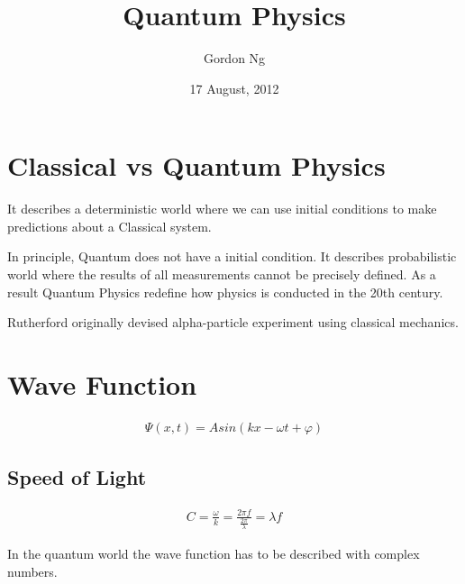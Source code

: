 \documentclass[12pt]{article}
\numberwithin{equation}{section}
\begin{document}
\title{Quantum Physics}
\date{17 August, 2012}
\author{Gordon Ng}
\maketitle
\pagebreak
\tableofcontents
\pagebreak
\section{Classical vs Quantum Physics}
It describes a deterministic world where we can use initial conditions to make predictions about a Classical system.

In principle, Quantum does not have a initial condition. It describes probabilistic world where the results of all measurements cannot be precisely defined.
As a result Quantum Physics redefine how physics is conducted in the 20th century.

Rutherford originally devised alpha-particle experiment using classical mechanics.

\section{Wave Function}
\begin{align}
\Psi(x,t) = A sin (kx - \omega t + \varphi)
\end{align}
\subsection{Speed of Light}
\begin{align}
C=\frac{\omega}{k}=\frac{2 \pi f}{\frac{2 \pi}{\lambda}}=\lambda f 
\end{align}

In the quantum world the wave function has to be described with complex numbers.
\end{document}
